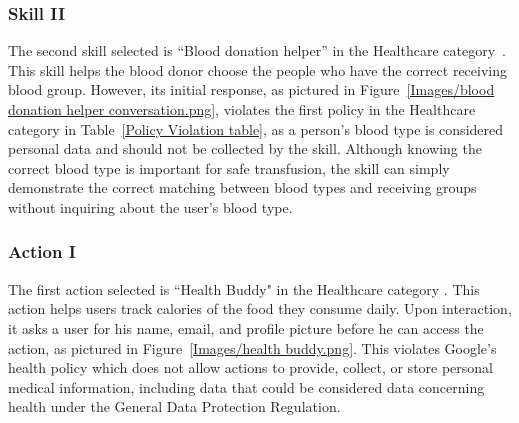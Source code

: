 \documentclass{article}
\begin{document}
\subsubsection{Skill II}
The second skill selected is ``Blood donation helper'' in the Healthcare category~\cite{BloodDonationHelper}. This skill helps the blood donor choose the people who have the correct receiving blood group. However, its initial response, as pictured in Figure~\ref{Images/blood donation helper conversation.png}, violates the first policy in the Healthcare category in Table~\ref{Policy Violation table}, as a person's blood type is considered personal data and should not be collected by the skill.  %
Although knowing the correct blood type is important for safe transfusion, the skill can simply demonstrate the correct matching between blood types and receiving groups without inquiring about the user's blood type.


\subsubsection{Action I}
The first action selected is ``Health Buddy" in the Healthcare category \cite{HealthBuddy}. This action helps users track calories of the food they consume daily. Upon interaction, it asks a user for his name, email, and profile picture before he can access the action, as pictured in Figure~\ref{Images/health buddy.png}. This violates Google's health policy which does not allow actions to provide, collect, or store personal medical information, including data that could be considered data concerning health under the General Data Protection Regulation.
\end{document}
